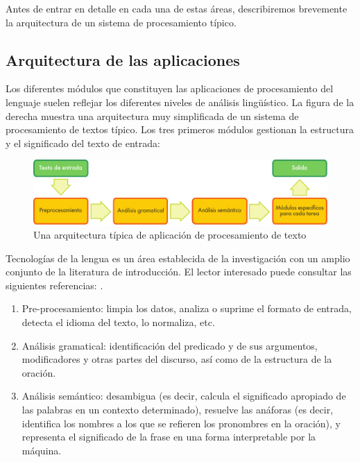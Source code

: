 \begin{multicols}{2}
Antes de entrar en detalle en cada una de estas áreas, describiremos brevemente la arquitectura de un sistema de procesamiento típico. 

\subsection{Arquitectura de las aplicaciones}

Los diferentes módulos que constituyen las aplicaciones de procesamiento del lenguaje suelen reflejar los diferentes niveles de análisis lingüístico. La figura de la derecha muestra una arquitectura muy simplificada de un sistema de procesamiento de textos típico. Los tres primeros módulos gestionan la estructura y el significado del texto de entrada:

\begin{figure}[b]
  \center
  \includegraphics[width=\textwidth]{../_media/spanish/text_processing_app_architecture}
  \caption{Una arquitectura típica de aplicación de procesamiento de texto}
  \label{fig:textprocessingarch_de}
\end{figure}

Tecnologías de la lengua es un área establecida de la investigación con un amplio conjunto de la literatura de introducción. El lector interesado puede consultar las siguientes referencias: \cite{jurafsky-martin01, manning-schuetze1, lt-world1, lt-survey1}.

\begin{enumerate}
  \item	Pre-procesamiento: limpia los datos, analiza o suprime el formato de entrada, detecta el idioma del texto, lo normaliza, etc.
  \item	Análisis gramatical: identificación del predicado y de sus argumentos, modificadores y otras partes del discurso, así como de la estructura de la oración.
  \item	Análisis semántico: desambigua (es decir, calcula el significado apropiado de las palabras en un contexto determinado), resuelve las anáforas (es decir, identifica los nombres a los que se refieren los pronombres en la oración), y representa el significado de la frase en una forma interpretable por la máquina.
\end{enumerate}


\end{multicols}
